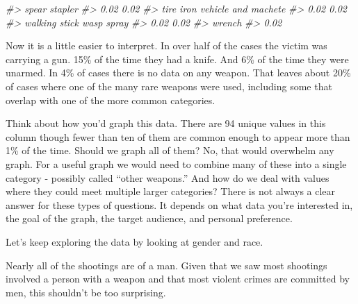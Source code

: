 \documentclass[
  12pt,
]{book}
\newenvironment{Shaded}{\begin{snugshade}}{\end{snugshade}}
\newcommand{\CommentTok}[1]{\textcolor[rgb]{0.37,0.37,0.37}{\textit{#1}}}
\newcommand{\DecValTok}[1]{\textcolor[rgb]{0.06,0.06,0.06}{#1}}
\newcommand{\KeywordTok}[1]{\textcolor[rgb]{0.27,0.27,0.27}{\textbf{#1}}}
\newcommand{\NormalTok}[1]{#1}
\newcommand{\OperatorTok}[1]{\textcolor[rgb]{0.43,0.43,0.43}{\textbf{#1}}}
\newcommand{\StringTok}[1]{\textcolor[rgb]{0.5,0.5,0.5}{#1}}
\begin{document}
\begin{Shaded}
\begin{Highlighting}[]
\CommentTok{\#>                            spear                          stapler }
\CommentTok{\#>                             0.02                             0.02 }
\CommentTok{\#>                        tire iron              vehicle and machete }
\CommentTok{\#>                             0.02                             0.02 }
\CommentTok{\#>                    walking stick                       wasp spray }
\CommentTok{\#>                             0.02                             0.02 }
\CommentTok{\#>                           wrench }
\CommentTok{\#>                             0.02}
\end{Highlighting}
\end{Shaded}

Now it is a little easier to interpret. In over half of the cases the victim was carrying a gun. 15\% of the time they had a knife. And 6\% of the time they were unarmed. In 4\% of cases there is no data on any weapon. That leaves about 20\% of cases where one of the many rare weapons were used, including some that overlap with one of the more common categories.

Think about how you'd graph this data. There are 94 unique values in this column though fewer than ten of them are common enough to appear more than 1\% of the time. Should we graph all of them? No, that would overwhelm any graph. For a useful graph we would need to combine many of these into a single category - possibly called ``other weapons.'' And how do we deal with values where they could meet multiple larger categories? There is not always a clear answer for these types of questions. It depends on what data you're interested in, the goal of the graph, the target audience, and personal preference.

Let's keep exploring the data by looking at gender and race.

\begin{Shaded}
\end{Shaded}

Nearly all of the shootings are of a man. Given that we saw most shootings involved a person with a weapon and that most violent crimes are committed by men, this shouldn't be too surprising.
\end{document}

